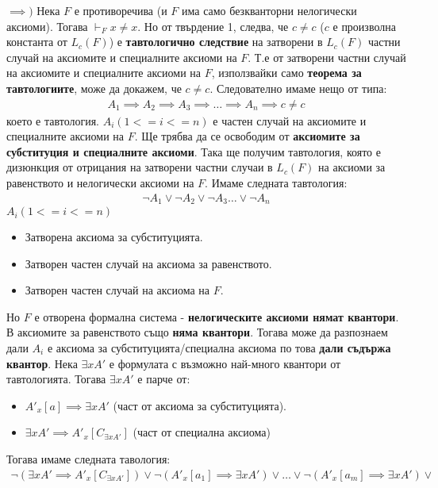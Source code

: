 \documentclass[french]{article}
\begin{document}
$\implies )$ Нека $F$ е противоречива (и $F$  има само безкванторни нелогически аксиоми). Тогава $\vdash_F x \neq x $. Но от твърдение 1, следва, че $c \neq c$ ($c$ е произволна константа от $L_c(F)$) е \textbf{тавтологично следствие} на затворени в $L_c(F)$ частни случай на аксиомите и специалните аксиоми на $F$. \newline
Т.е от затворени частни случай на аксиомите и специалните аксиоми на $F$, използвайки само \textbf{теорема за тавтологиите}, може да докажем, че $c \neq c$.
Следователно имаме нещо от типа:
\begin{align*}
A_1 \implies A_2 \implies A_3 \implies \dots \implies A_n \implies c \neq c
\end{align*}
което е тавтология. $A_i (1<= i <= n)$ е частен случай на аксиомите и специалните аксиоми на $F$.
Ще трябва да се освободим от \textbf{аксиомите за субституция и специалните аксиоми}.
Така ще получим тавтология, която е дизюнкция от отрицания на затворени частни случаи в $L_c(F)$ на аксиоми за равенството и нелогически аксиоми на $F$.
Имаме следната тавтология:
\begin{align*}
\neg A_1 \lor \neg A_2 \lor \neg A_3 \dots \lor \neg A_n
\end{align*}
$A_i (1<= i <= n)$
\begin{itemize} 
	\item Затворена аксиома за субституцията.
	\item Затворен частен случай на аксиома за равенството.
	\item Затворен частен случай на аксиома на $F$.
\end{itemize}
Но $F$ е отворена формална система - \textbf{нелогическите аксиоми нямат квантори}. В аксиомите за равенството също \textbf{няма квантори}.
Тогава може да разпознаем дали $A_i$ е аксиома за субституцията/специална аксиома по това \textbf{дали съдържа квантор}. \newline
Нека $\exists x A'$ е формулата с възможно най-много квантори от тавтологията.
Тогава $\exists x A'$ е парче от: 
\begin{itemize} 
	\item $A'_x[a] \implies \exists x A'$ (част от аксиома за субституцията).
	\item $\exists x A' \implies A'_x[C_{\exists x A'}]$ (част от специална аксиома)
\end{itemize}
Тогава имаме следната тавология:
\begin{align*}
\neg (\exists x A' \implies A'_x[C_{\exists x A'}]) \lor 	\neg (A'_x[a_1] \implies \exists x A') \lor \dots 	\lor \neg(A'_x[a_m] \implies \exists x A')  \lor 
\end{align*}
\end{document}
